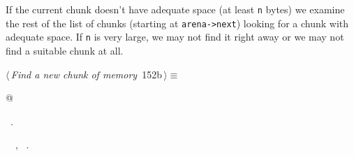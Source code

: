 \documentclass[a4paper]{report}
\begin{document}
If the current chunk doesn't have adequate space (at least \verb|n|
bytes) we examine the rest of the list of chunks (starting at
\verb|arena->next|) looking for a chunk with adequate space. If \verb|n|
is very large, we may not find it right away or we may not find a
suitable chunk at all.
\begin{flushleft} \small
\begin{minipage}{\linewidth}\label{scrap341}\raggedright\small
{} $\langle\,${\it Find a new chunk of memory}\nobreak\ {\footnotesize {152b}}$\,\rangle\equiv$
\vspace{-1ex}
\begin{list}{}{} \item
\mbox{}@{\NWsep}
\end{list}
\vspace{-1.5ex}
\footnotesize
\begin{list}{}{\setlength{\itemsep}{-\parsep}\setlength{\itemindent}{-\leftmargin}}
\item \NWtxtMacroRefIn\ .
\item \NWtxtIdentsUsed\nobreak\  \verb@arena@\nobreak\ , \verb@Chunk@\nobreak\ .
\item{}
\end{list}
\end{minipage}\vspace{4ex}
\end{flushleft}
\end{document}
